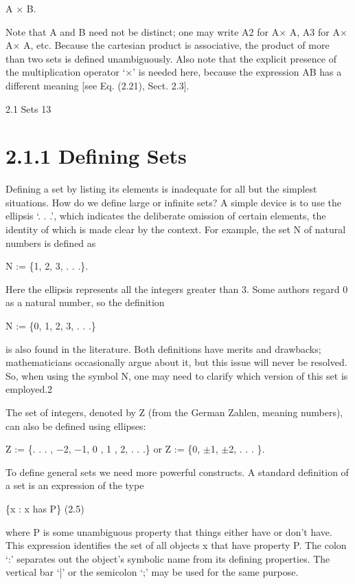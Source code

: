 \documentclass[11pt]{article}
\theoremstyle{plain}
\theoremstyle{definition}
\begin{document}
A $\times$ B.

Note that A and B need not be distinct; one may write A2 for A$\times$ A, A3 for A$\times$ A$\times$ A, etc. Because the cartesian product is associative, the product of more than two sets is defined unambiguously. Also note that the explicit presence of the multiplication operator `$\times$' is needed here, because the expression AB has a different meaning [see Eq. (2.21), Sect. 2.3].

2.1 Sets 13

\section{2.1.1 Defining Sets}

Defining a set by listing its elements is inadequate for all but the simplest situations. How do we define large or infinite sets? A simple device is to use the ellipsis `. . .', which indicates the deliberate omission of certain elements, the identity of which is made clear by the context. For example, the set N of natural numbers is defined as

N := \{1, 2, 3, . . .\}.

Here the ellipsis represents all the integers greater than 3. Some authors regard 0 as a natural number, so the definition

N := \{0, 1, 2, 3, . . .\}

is also found in the literature. Both definitions have merits and drawbacks; mathematicians occasionally argue about it, but this issue will never be resolved. So, when using the symbol N, one may need to clarify which version of this set is employed.2

The set of integers, denoted by Z (from the German Zahlen, meaning numbers), can also be defined using ellipses:

Z := \{. . . , $-$2, $-$1, 0 , 1 , 2, . . .\} or Z := \{0, $\pm$1, $\pm$2, . . . \}.

To define general sets we need more powerful constructs. A standard definition of a set is an expression of the type

\{x : x has P\} (2.5)

where P is some unambiguous property that things either have or don't have. This expression identifies the set of all objects x that have property P. The colon `:' separates out the object's symbolic name from its defining properties. The vertical bar `|' or the semicolon `;' may be used for the same purpose.
\end{document}
